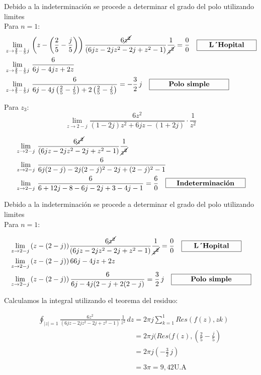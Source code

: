 \documentclass[12pt,a4paper]{report}
\begin{document}
Debido a la indeterminación se procede a determinar el grado del polo utilizando limites\\[8pt]
Para $n=1$:
\begin{align*}
&\lim_{z \to \frac{2}{5}-\frac{1}{5}j}\,\left(z-\left( \frac{2}{5}-\frac{j}{5} \right)\right)\frac{6\cancel{z^2}}{(6jz-2jz^2-2j+z^2-1)}\frac{1}{\cancel{z^2}}=\frac{0}{0} \quad \framebox[3cm][c]{\textbf{L´Hopital}}\\
&\lim_{z \to \frac{2}{5}-\frac{1}{5}j}\,\frac{6}{6j-4jz+2z}\\
&\lim_{z \to \frac{2}{5}-\frac{1}{5}j}\,\frac{6}{6j-4j\left(\frac{2}{5}-\frac{j}{5} \right) +2 \left(\frac{2}{5}-\frac{j}{5} \right)}= -\frac{3}{2}\, j \quad \framebox[4cm][c]{\textbf{Polo simple}}\\
\end{align*}


Para $z_3$:
$$\lim_{z \to 2-j}\frac{6z^2}{(1- 2j)z^{2} + 6jz - (1 + 2j)} \cdot \frac{1}{z^2}
$$

\begin{align*}
&\lim_{z \to 2-j}\,\frac{6\cancel{z^2}}{(6jz-2jz^2-2j+z^2-1)}\frac{1}{\cancel{z^2}}\\
&\lim_{z \to 2-j}\, \frac{6}{6j(2-j)-2j(2-j)^2-2j+(2-j)^2-1}\\
&\lim_{z \to 2-j}\,\frac{6}{6+12j-8-6j-2j+3-4j-1}= \frac{6}{0} \quad \framebox[4cm][c]{\textbf{Indeterminación}}\\
\end{align*}

Debido a la indeterminación se procede a determinar el grado del polo utilizando limites\\[8pt]
Para $n=1$:

\begin{align*}
&\lim_{z \to 2-j}\,(z-(2-j))\frac{6\cancel{z^2}}{(6jz-2jz^2-2j+z^2-1)}\frac{1}{\cancel{z^2}}=\frac{0}{0}\quad \framebox[3cm][c]{\textbf{L´Hopital}}\\
&\lim_{z \to 2-j}\,(z-(2-j))\, {6}{6j-4jz+2z}\\
&\lim_{z \to 2-j}\,(z-(2-j))\, \frac{6}{6j-4j(2-j+2(2-j)}=\frac{3}{2} \, j \quad \framebox[4cm][c]{\textbf{Polo simple}}\\
\end{align*}

Calculamos la integral utilizando el teorema del residuo:

\begin{align*}
& \oint_{|z|=1} \frac{6z^2}{(6jz-2jz^2-2j+z^2-1)}\frac{1}{z^2}\, dz= 2\pi j \sum_{k=1}^1 Res(f(z),zk)\\
&\phantom{\oint_{|z|=1} \frac{6z^2}{(6jz-2jz^2-2j+z^2-1)}\frac{1}{z^2}\, dz}=2\pi j (Res(f(z),\left( \frac{2}{5}-\frac{j}{5} \right)\\
&\phantom{\oint_{|z|=1} \frac{6z^2}{(6jz-2jz^2-2j+z^2-1)}\frac{1}{z^2}\, dz}=2\pi j \left( -\frac{3}{2}\,j \right)\\
&\phantom{\oint_{|z|=1} \frac{6z^2}{(6jz-2jz^2-2j+z^2-1)}\frac{1}{z^2}\, dz}=3\pi = 9,42 \text{U.A}\\
\end{align*}
\end{document}
